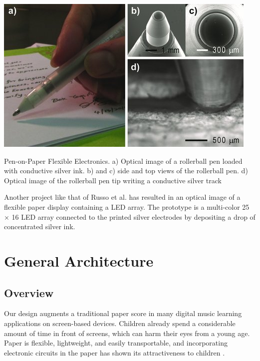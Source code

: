 \begin{marginfigure}
   \centering
   \includegraphics{images/IS_pen-on-paper.jpg}
   \caption{Pen-on-Paper Flexible Electronics. a) Optical image of a rollerball pen loaded with conductive silver ink. b) and c) side and top views of the rollerball pen. d) Optical image of the rollerball pen tip writing a conductive silver track}
   \label{fig:IS_pen-on-paper}
\end{marginfigure}

Another project like that of Russo et al. \cite{russo2011pen} has resulted in an optical image of a flexible paper display containing a LED array. The prototype is a multi-color 25 × 16 LED array connected to the printed silver electrodes by depositing a drop of concentrated silver ink.

\section{General Architecture}

\subsection{Overview}




Our design augments a traditional paper score in many digital music learning applications on screen-based devices. Children already spend a considerable amount of time in front of screens, which can harm their eyes from a young age. Paper is flexible, lightweight, and easily transportable, and incorporating electronic circuits in the paper has shown its attractiveness to children \cite{hershman2018light}. 

